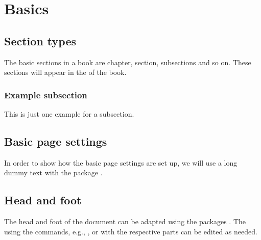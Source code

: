 \chapter{Basics}

\pagestyle{fancy}
\fancyhf{}
\fancyhead[OC]{\leftmark}
\fancyhead[EC]{\rightmark}
\cfoot{\thepage}


\section{Section types}

The basic sections in a book are chapter, section, subsections and so on. These sections will appear in the  of the book.


\subsection{Example subsection}

This is just one example for a subsection.


\section{Basic page settings}

In order to show how the basic page settings are set up, we will use a long dummy text with the package .

\blindtext[6]

\blindtext

\blindtext[7]


\section{Head and foot}

The head and foot of the document can be adapted using the packages . The using the commands, e.g., ,  or with  the respective parts can be edited as needed.

